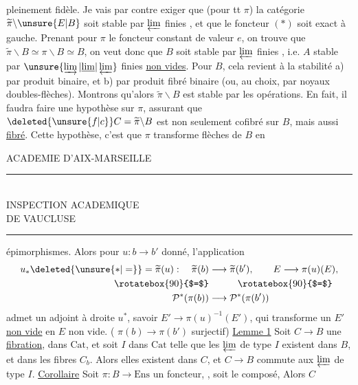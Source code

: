 pleinement fidèle. Je vais par contre exiger que (pour tt $\pi$) la catégorie $\widetilde\pi\backslash \unsure{E|B}$ soit stable par $\varprojlim$ finies , et que le foncteur $(*)$ soit exact à gauche.
Prenant pour $\pi$ le foncteur constant de valeur $e$, on trouve que $\widetilde\pi\backslash B\simeq\pi\backslash B\simeq B$, on veut donc que $B$ soit stable par $\varprojlim$ finies , i.e. $A$ stable par $\unsure{\varinjlim|\underline{\lim}|\varprojlim}$ finies \uline{non vides}. Pour $B$, cela revient à la stabilité a) par produit binaire, et b) par produit fibré binaire (ou, au choix, par noyaux  doubles-flèches). Montrons qu'alors $\widetilde\pi\backslash B$ est stable par les  opérations.
En fait, il faudra faire une hypothèse sur $\pi$, assurant que $\deleted{\unsure{f|c}}C=\widetilde\pi\backslash B$ est non seulement cofibré sur $B$, mais aussi \uline{fibré}. Cette hypothèse, c'est que $\pi$ transforme flèches de $B$ en

\begin{center}
ACADEMIE D'AIX-MARSEILLE\\
\rule{4em}{0.4pt}\\
INSPECTION ACADEMIQUE\\
DE VAUCLUSE\\
\rule{1.6em}{0.4pt}
\end{center}
épimorphismes. Alors  pour $u:b\longrightarrow b'$ donné, l'application
\[
\begin{aligned}
 u_*\deleted{\unsure{*|=}}=\widetilde\pi(u):\quad\widetilde\pi(b)&\longrightarrow\widetilde\pi(b'),\qquad E\longrightarrow\pi(u)(E),\\
 \rotatebox{90}{$=$}&\hspace{3em}\rotatebox{90}{$=$}\\
 \mathcal P^*(\pi(b))&\longrightarrow\mathcal P^*(\pi(b'))
\end{aligned}
\]
admet un adjoint à droite  $u^*$, savoir $E'\longrightarrow\pi(u)^{-1}(E')$, qui transforme un $E'$ \uline{non vide} en $E$ non vide. ( $\pi(b)\longrightarrow\pi(b')$ surjectif)
\uline{Lemme 1} Soit $C\longrightarrow B$ une \uline{fibration}, dans $\mathrm{Cat}$, et  soit $I$ dans $\mathrm{Cat}$ telle que les $\varprojlim$ de type $I$ existent dans $B$, et dans les fibres $C_b$. Alors elles existent dans $C$, et $C\longrightarrow B$ commute aux $\varprojlim$ de type $I$.
\uline{Corollaire} Soit $\pi:B\longrightarrow\mathrm{Ens}$ un foncteur, , soit
le composé,  Alors $C$

